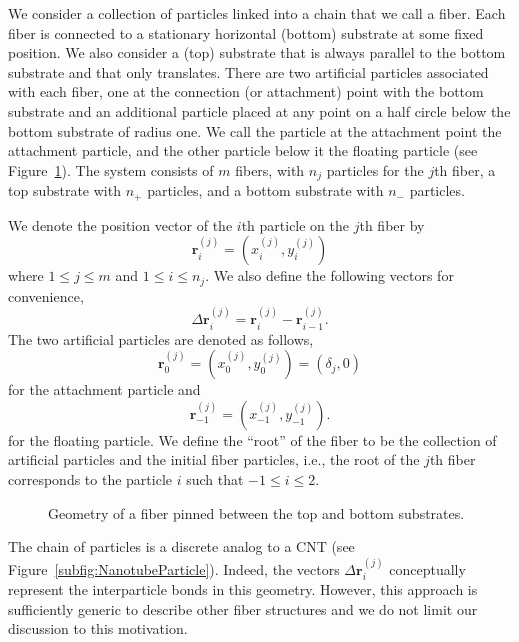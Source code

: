   We consider a collection of particles linked into a chain that we call a fiber. Each fiber is connected to a stationary horizontal (bottom) substrate at some fixed position. We also consider a (top) substrate that is always parallel to the bottom substrate and that only translates. There are two artificial particles associated with each fiber, one at the connection (or attachment) point with the bottom substrate and an additional particle placed at any point on a half circle below the bottom substrate of radius one. We call the particle at the attachment point the attachment particle, and the other particle below it the floating particle (see Figure~\ref{fig:Geometry}). The system consists of $m$ fibers, with $n_j$ particles for the $j$th fiber, a top substrate with $n_+$ particles, and a bottom substrate with $n_-$ particles.

We denote the position vector of the $i$th particle on the $j$th fiber by
\begin{equation}
	\textbf{r}_i^{(j)} = (x_i^{(j)},y_i^{(j)})
\end{equation}
where $1 \leq j \leq m$ and $1 \leq i \leq n_j$. We also define the following vectors for convenience,
\begin{equation}
	\Delta \textbf{r}_i^{(j)} = \textbf{r}_i^{(j)} - \textbf{r}_{i-1}^{(j)}.
\end{equation}
The two artificial particles are denoted as follows,
\begin{equation}
	\textbf{r}_0^{(j)} = (x_0^{(j)},y_0^{(j)}) = (\delta_j,0)
\end{equation}
for the attachment particle and
\begin{equation}
	\textbf{r}_{-1}^{(j)} = (x_{-1}^{(j)},y_{-1}^{(j)}).
\end{equation}
for the floating particle. We define the ``root'' of the fiber to be the collection of artificial particles and the initial fiber particles, i.e., the root of the $j$th fiber corresponds to the particle $i$ such that $-1 \leq i \leq 2$.

	\begin{figure}[t]
		\begin{center}
			
		\end{center}		
		\caption{Geometry of a fiber pinned between the top and bottom substrates.
		\label{fig:Geometry}}
	\end{figure}


	The chain of particles is a discrete analog to a CNT (see Figure~\ref{subfig:NanotubeParticle}). Indeed, the vectors $\Delta \textbf{r}_i^{(j)}$ conceptually represent the interparticle bonds in this geometry. However, this approach is sufficiently generic to describe other fiber structures and we do not limit our discussion to this motivation.
	
